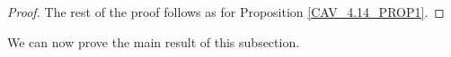 \documentclass[a4paper,10pt
,draft
]{article}%
\renewcommand{\F}{\mathcal F}
\renewcommand{\1}{\eta}%
\begin{document}
\begin{proof}
      The rest of the proof follows as for Proposition \ref{CAV_4.14_PROP1}.

      
\end{proof}

We can now prove the main result of this subsection.
 
\end{document}
